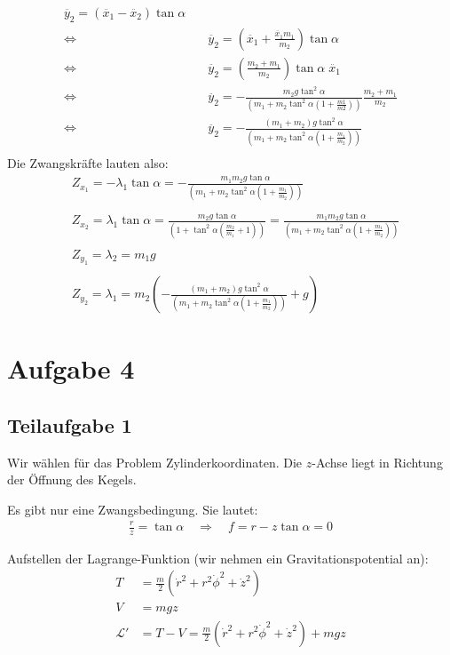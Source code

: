 \documentclass[a4paper,german,12pt,smallheadings]{scrartcl}
\begin{document}
\begin{align*}
\ddot{y_2}=\left(\ddot{x_1}-\ddot{x_2}\right) \tan \alpha\\
\Leftrightarrow & \quad \ddot{y_2}=\left(\ddot{x_1}+\frac{\ddot{x_1}m_1}{m_2}\right) \tan \alpha\\
\Leftrightarrow & \quad \ddot{y_2}=\left(\frac{m_2+m_1}{m_2}\right) \tan \alpha \; \ddot{x_1}\\
\Leftrightarrow & \quad \ddot{y_2}=-\frac{m_2g\tan^2 \alpha}{\left(m_1+m_2\tan^2 \alpha \left(1+\frac{m1}{m2}\right)\right)} \frac{m_2+m_1}{m_2}\\
\Leftrightarrow & \quad \ddot{y_2}=-\frac{\left(m_1+m_2\right)g\tan^2 \alpha}{\left(m_1+m_2\tan^2 \alpha \left(1+\frac{m_1}{m_2}\right)\right)}\\
\end{align*}
Die Zwangskräfte lauten also:
\begin{align*}
& Z_{x_1}=-\lambda_1 \tan \alpha=-\frac{m_1 m_2 g \tan \alpha}{\left(m_1+m_2 \tan^2 \alpha \left(1+\frac{m_1}{m_2}\right)\right)}\\
\\
& Z_{x_2}=\lambda_1 \tan \alpha=\frac{m_2 g \tan \alpha}{\left(1+\tan^2 \alpha \left(\frac{m_2}{m_1}+1\right) \right)}=\frac{m_1 m_2 g \tan \alpha}{\left(m_1+m_2 \tan^2 \alpha \left(1+\frac{m_1}{m_2}\right)\right)}\\
\\
& Z_{y_1}=\lambda_2=m_1g\\
\\
& Z_{y_2}=\lambda_1=m_2\left(-\frac{\left(m_1+m_2\right)g\tan^2 \alpha}{\left(m_1+m_2\tan^2 \alpha \left(1+\frac{m_1}{m_2}\right)\right)}+g\right)
\end{align*}

\section*{Aufgabe 4}
\subsection*{Teilaufgabe 1}
Wir wählen für das Problem Zylinderkoordinaten. Die $z$-Achse liegt in Richtung
der Öffnung des Kegels.

Es gibt nur eine Zwangsbedingung. Sie lautet:
\begin{align*}
\frac{r}{z}=\tan \alpha \quad \Rightarrow \quad f=r-z \tan \alpha =0
\end{align*}

Aufstellen der Lagrange-Funktion (wir nehmen ein Gravitationspotential an):
\begin{align*}
T&=\frac{m}{2} (\dot{r}^2+r^2\dot{\phi}^2+\dot{z}^2) \\
V&=mgz \\
\mathcal{L}'&=T-V=\frac{m}{2}(\dot{r}^2+r^2\dot{\phi}^2+\dot{z}^2) + mgz
\end{align*}
\end{document}
